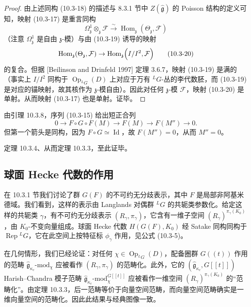 \begin{proof}
    由上述同构 (10.3-18) 的描述与 8.3.1 节中 $Z(\hat{\mathfrak{g}})$ 的 Poisson 结构的定义可知，映射 (10.3-17) 是重言同构
    \[
        \Omega^1_{\mathfrak{z}}\otimes_{\mathfrak{z}}\mathcal{F}
        \xrightarrow{\ \sim\ }\operatorname{Hom}_{\mathfrak{z}}(\Theta_{\mathfrak{z}},\mathcal{F})
    \]
    （注意 $\Omega^1_{\mathfrak{z}}$ 是自由 $\mathfrak{z}$-模）与由 (10.3-19) 诱导的映射
    \begin{equation}
        \operatorname{Hom}_{\mathfrak{z}}(\Theta_{\mathfrak{z}},\mathcal{F})
        \to\operatorname{Hom}_{\mathfrak{z}}\Bigl(I/I^2,\mathcal{F}\Bigr)
        \tag{10.3-20}
    \end{equation}
    的复合。但据 [Beilinson and Drinfeld 1997] 定理 3.6.7，映射 (10.3-19) 是满的（事实上 $I/I^2$ 同构于 $\operatorname{Op}_{{}^LG}(D)$ 上对应于万有 ${}^LG$-丛的李代数胚，而 (10.3-19) 是对应的锚映射，故其核作为 $\mathfrak{z}$-模自由）。因此对任何 $\mathfrak{z}$-模 $\mathcal{F}$，映射 (10.3-20) 是单射。从而映射 (10.3-17) 也是单射。证毕。
\end{proof}

由引理 10.3.8，序列 (10.3-15) 给出短正合列
\[
    0\to F\circ G\circ F(M)\to F(M)\to F(M'')\to0.
\]
但第一个箭头是同构，因为 $F\circ G\simeq\operatorname{Id}$，故 $F(M'')=0$，从而 $M''=0$。

定理 10.3.4、从而定理 10.3.3，至此证毕。

\subsection{球面 Hecke 代数的作用}

在 10.3.1 节我们讨论了群 $G(F)$ 的不可约无分歧表示，其中 $F$ 是局部非阿基米德域。我们看到，这样的表示由 Langlands 对偶群 ${}^LG$ 的共轭类参数化。给定这样的共轭类 $\gamma$，有不可约无分歧表示 $(R_\gamma,\pi_\gamma)$，它含有一维子空间 $(R_\gamma)^{\pi_\gamma(K_0)}$，由 $K_0$-不变向量组成。球面 Hecke 代数 $H(G(F),K_0)$ 经 Satake 同构同构于 $\operatorname{Rep}{}^LG$，它在此空间上按特征标 $\phi_\gamma$ 作用，见公式 (10.3-5)。

在几何情形，我们已经论证：对任何 $\chi\in\operatorname{Op}_{{}^LG}(D)$，配备圈群 $G((t))$ 作用的范畴 $\hat{\mathfrak{g}}_{\kappa_c}\text{-mod}_\chi$ 应被看作 $(R_\gamma,\pi_\gamma)$ 的范畴化。此外，它的 $(\hat{\mathfrak{g}}_{\kappa_c},G[[t]])$ Harish--Chandra 模子范畴 $\hat{\mathfrak{g}}_{\kappa_c}\text{-mod}^{G[[t]]}_\chi$ 应被看作一维空间 $(R_\gamma)^{\pi_\gamma(K_0)}$ 的“范畴化”。由定理 10.3.3，后一范畴等价于向量空间范畴，而向量空间范畴确实是一维向量空间的范畴化。因此此结果与经典图像一致。

